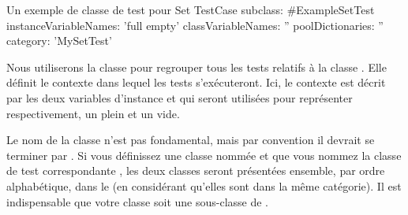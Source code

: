 \documentclass[a4paper,10pt,twoside]{book}
\begin{document}
\newpage{}
\begin{classdef}[exampleSetTest]{Un exemple de classe de test pour Set}
TestCase subclass: #ExampleSetTest
	instanceVariableNames: 'full empty'
	classVariableNames: ''
  poolDictionaries: ''
	category: 'MySetTest'
\end{classdef}
% 

Nous utiliserons la classe  pour regrouper tous les tests relatifs
à la classe . Elle définit le contexte dans lequel les tests s'exécuteront. Ici, le contexte est décrit par les deux variables d'instance  et  qui seront utilisées pour représenter respectivement, un  plein et un  vide.

Le nom de la classe n'est pas fondamental, mais par convention il devrait se terminer par .
Si vous définissez une classe nommée  et que vous nommez la classe de test correspondante , les deux classes seront présentées ensemble, par ordre alphabétique, dans le  (en considérant qu'elles sont dans la même catégorie). Il est indispensable que votre classe soit une sous-classe de .

\end{document}

